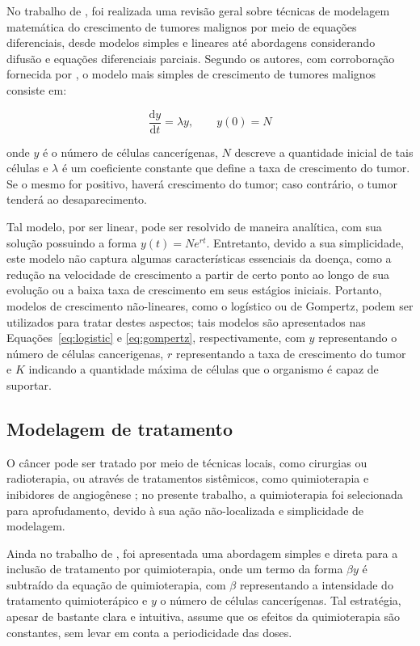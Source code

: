 \documentclass[12pt]{article}
\begin{document}
No trabalho de \cite{Enderling2014}, foi realizada uma revisão geral sobre técnicas de modelagem matemática do crescimento de tumores malignos por meio de equações diferenciais, desde modelos simples e lineares até abordagens considerando difusão e equações diferenciais parciais. Segundo os autores, com corroboração fornecida por \cite{Sachs2001}, o modelo mais simples de crescimento de tumores malignos consiste em:

\begin{equation} \label{eq:linear}
  \frac{\mathrm{d} y}{\mathrm{d} t} = \lambda y, \qquad y(0) = N
\end{equation}

\noindent onde $y$ é o número de células cancerígenas, $N$ descreve a quantidade inicial de tais células e $\lambda$ é um coeficiente constante que define a taxa de crescimento do tumor. Se o mesmo for positivo, haverá crescimento do tumor; caso contrário, o tumor tenderá ao desaparecimento.

Tal modelo, por ser linear, pode ser resolvido de maneira analítica, com sua solução possuindo a forma $y(t) = N e^{r t}$. Entretanto, devido a sua simplicidade, este modelo não captura algumas características essenciais da doença, como a redução na velocidade de crescimento a partir de certo ponto ao longo de sua evolução ou a baixa taxa de crescimento em seus estágios iniciais. Portanto, modelos de crescimento não-lineares, como o logístico ou de Gompertz, podem ser utilizados para tratar destes aspectos; tais modelos são apresentados nas Equações~\ref{eq:logistic} e \ref{eq:gompertz}, respectivamente, com $y$ representando o número de células cancerigenas, $r$ representando a taxa de crescimento do tumor e $K$ indicando a quantidade máxima de células que o organismo é capaz de suportar.

\subsection{Modelagem de tratamento} \label{sec:treatment}

O câncer pode ser tratado por meio de técnicas locais, como cirurgias ou radioterapia, ou através de tratamentos sistêmicos, como quimioterapia e inibidores de angiogênese \cite{Sanga2006}; no presente trabalho, a quimioterapia foi selecionada para aprofudamento, devido à sua ação não-localizada e simplicidade de modelagem.

Ainda no trabalho de \cite{Enderling2014}, foi apresentada uma abordagem simples e direta para a inclusão de tratamento por quimioterapia, onde um termo da forma $\beta y$ é subtraído da equação de quimioterapia, com $\beta$ representando a intensidade do tratamento quimioterápico e $y$ o número de células cancerígenas. Tal estratégia, apesar de bastante clara e intuitiva, assume que os efeitos da quimioterapia são constantes, sem levar em conta a periodicidade das doses.
\end{document}
